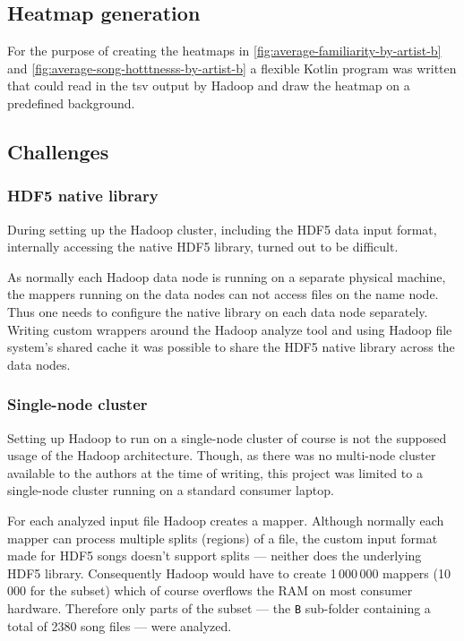 \documentclass[                                                             %
        12pt,                                                                   %
        twoside                                                                 %
    ]{scrartcl}                                                                 %
\begin{document}
\subsection{Heatmap generation}

For the purpose of creating the heatmaps 
in \autoref{fig:average-familiarity-by-artist-b} 
and \autoref{fig:average-song-hotttnesss-by-artist-b}
a flexible Kotlin program was written that could read in
the \gls{tsv} output by Hadoop and draw the heatmap 
on a predefined background.

\subsection{Challenges}

\subsubsection{HDF5 native library}

During setting up the Hadoop cluster,
including the HDF5 data input format,
internally accessing the native HDF5 library, 
turned out to be difficult.

As normally each Hadoop data node 
is running on a separate physical machine,
the mappers running on the data nodes can not
access files on the name node.
Thus one needs to configure 
the native library on each data node separately.
Writing custom wrappers around the Hadoop analyze tool 
and using Hadoop file system's shared cache 
it was possible to share the HDF5 native library
across the data nodes.

\subsubsection{Single-node cluster}

Setting up Hadoop to run on a single-node cluster 
of course is not the supposed usage 
of the Hadoop architecture.
Though, as there was no multi-node cluster 
available to the authors at the time of writing, 
this project was limited to a single-node cluster
running on a standard consumer laptop.

For each analyzed input file Hadoop creates a mapper. 
Although normally each mapper can process 
multiple splits (regions) of a file, 
the custom input format made for HDF5 songs 
doesn't support splits --- neither does 
the underlying HDF5 library. 
Consequently Hadoop would have 
to create 1\,000\,000 mappers (10\,000 for the subset) 
which of course overflows the RAM 
on most consumer hardware.
Therefore only parts of the subset --- 
the \texttt{B} sub-folder containing a total 
of 2380 song files --- were analyzed.
\end{document}
